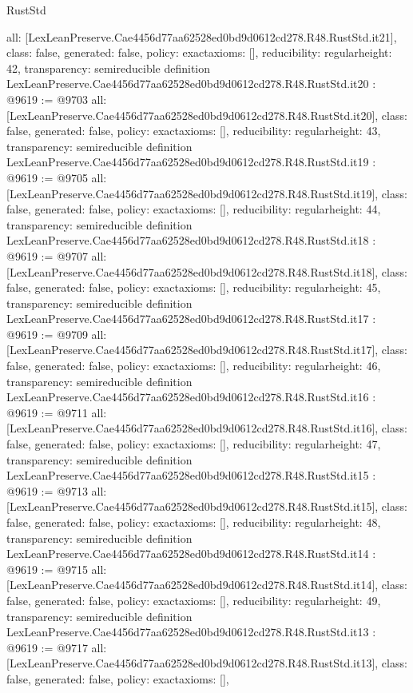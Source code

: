 \begin{lexlean}{RustStd}
\begin{coremodule}
{  all: [LexLeanPreserve.Cae4456d77aa62528ed0bd9d0612cd278.R48.RustStd.it21],
  class: false,
  generated: false,
  policy: exact{axioms: []},
  reducibility: regular{height: 42},
  transparency: semireducible
}
definition LexLeanPreserve.Cae4456d77aa62528ed0bd9d0612cd278.R48.RustStd.it20 : @9619 := @9703 {
  all: [LexLeanPreserve.Cae4456d77aa62528ed0bd9d0612cd278.R48.RustStd.it20],
  class: false,
  generated: false,
  policy: exact{axioms: []},
  reducibility: regular{height: 43},
  transparency: semireducible
}
definition LexLeanPreserve.Cae4456d77aa62528ed0bd9d0612cd278.R48.RustStd.it19 : @9619 := @9705 {
  all: [LexLeanPreserve.Cae4456d77aa62528ed0bd9d0612cd278.R48.RustStd.it19],
  class: false,
  generated: false,
  policy: exact{axioms: []},
  reducibility: regular{height: 44},
  transparency: semireducible
}
definition LexLeanPreserve.Cae4456d77aa62528ed0bd9d0612cd278.R48.RustStd.it18 : @9619 := @9707 {
  all: [LexLeanPreserve.Cae4456d77aa62528ed0bd9d0612cd278.R48.RustStd.it18],
  class: false,
  generated: false,
  policy: exact{axioms: []},
  reducibility: regular{height: 45},
  transparency: semireducible
}
definition LexLeanPreserve.Cae4456d77aa62528ed0bd9d0612cd278.R48.RustStd.it17 : @9619 := @9709 {
  all: [LexLeanPreserve.Cae4456d77aa62528ed0bd9d0612cd278.R48.RustStd.it17],
  class: false,
  generated: false,
  policy: exact{axioms: []},
  reducibility: regular{height: 46},
  transparency: semireducible
}
definition LexLeanPreserve.Cae4456d77aa62528ed0bd9d0612cd278.R48.RustStd.it16 : @9619 := @9711 {
  all: [LexLeanPreserve.Cae4456d77aa62528ed0bd9d0612cd278.R48.RustStd.it16],
  class: false,
  generated: false,
  policy: exact{axioms: []},
  reducibility: regular{height: 47},
  transparency: semireducible
}
definition LexLeanPreserve.Cae4456d77aa62528ed0bd9d0612cd278.R48.RustStd.it15 : @9619 := @9713 {
  all: [LexLeanPreserve.Cae4456d77aa62528ed0bd9d0612cd278.R48.RustStd.it15],
  class: false,
  generated: false,
  policy: exact{axioms: []},
  reducibility: regular{height: 48},
  transparency: semireducible
}
definition LexLeanPreserve.Cae4456d77aa62528ed0bd9d0612cd278.R48.RustStd.it14 : @9619 := @9715 {
  all: [LexLeanPreserve.Cae4456d77aa62528ed0bd9d0612cd278.R48.RustStd.it14],
  class: false,
  generated: false,
  policy: exact{axioms: []},
  reducibility: regular{height: 49},
  transparency: semireducible
}
definition LexLeanPreserve.Cae4456d77aa62528ed0bd9d0612cd278.R48.RustStd.it13 : @9619 := @9717 {
  all: [LexLeanPreserve.Cae4456d77aa62528ed0bd9d0612cd278.R48.RustStd.it13],
  class: false,
  generated: false,
  policy: exact{axioms: []},
}
\end{coremodule}
\end{lexlean}
